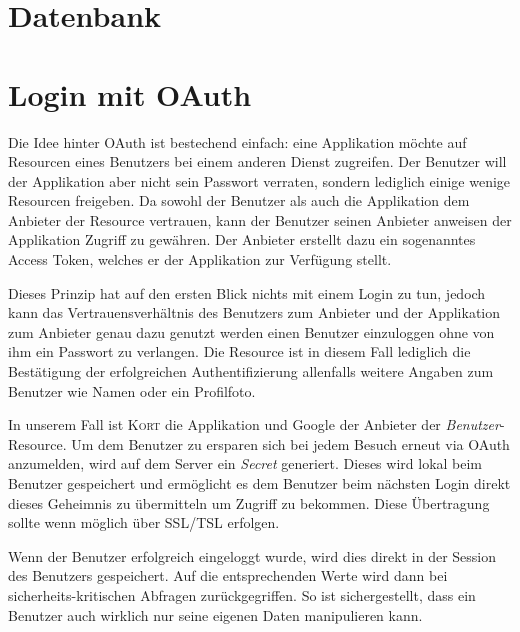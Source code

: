 
\section{Datenbank}


\section{Login mit OAuth}
\label{oauth}


Die Idee hinter OAuth ist bestechend einfach: eine Applikation möchte auf Resourcen eines Benutzers bei einem anderen Dienst zugreifen.
Der Benutzer will der Applikation aber nicht sein Passwort verraten, sondern lediglich einige wenige Resourcen freigeben.
Da sowohl der Benutzer als auch die Applikation dem Anbieter der Resource vertrauen, kann der Benutzer seinen Anbieter anweisen der Applikation Zugriff zu gewähren.
Der Anbieter erstellt dazu ein sogenanntes Access Token, welches er der Applikation zur Verfügung stellt.

Dieses Prinzip hat auf den ersten Blick nichts mit einem Login zu tun, jedoch kann das Vertrauensverhältnis des Benutzers zum Anbieter und der Applikation zum Anbieter genau dazu genutzt werden einen Benutzer einzuloggen ohne von ihm ein Passwort zu verlangen. 
Die Resource ist in diesem Fall lediglich die Bestätigung der erfolgreichen Authentifizierung allenfalls weitere Angaben zum Benutzer wie Namen oder ein Profilfoto.


In unserem Fall ist \textsc{Kort} die Applikation und Google der Anbieter der \emph{Benutzer}-Resource.
Um dem Benutzer zu ersparen sich bei jedem Besuch erneut via OAuth anzumelden, wird auf dem Server ein \emph{Secret} generiert.
Dieses wird lokal beim Benutzer gespeichert und ermöglicht es dem Benutzer beim nächsten Login direkt dieses Geheimnis zu übermitteln um Zugriff zu bekommen.
Diese Übertragung sollte wenn möglich über SSL/TSL erfolgen.

Wenn der Benutzer erfolgreich eingeloggt wurde, wird dies direkt in der Session des Benutzers gespeichert.
Auf die entsprechenden Werte wird dann bei sicherheits-kritischen Abfragen zurückgegriffen.
So ist sichergestellt, dass ein Benutzer auch wirklich nur seine eigenen Daten manipulieren kann.

